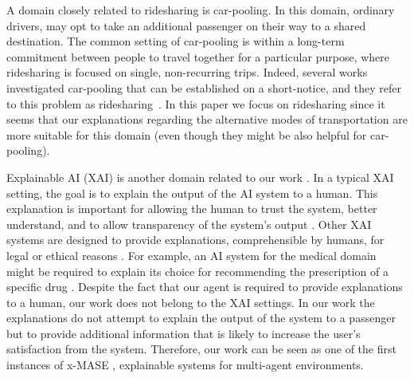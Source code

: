 \documentclass[letterpaper]{article} %
\begin{document}
A domain closely related to ridesharing is car-pooling. In this domain, ordinary drivers, may opt to take an additional passenger on their way to a shared destination. The common setting of car-pooling is within a long-term commitment between people to travel together for a particular purpose, where ridesharing is focused on single, non-recurring trips.
Indeed, several works investigated car-pooling that can be established on a short-notice, and they refer to this problem as ridesharing~\cite{agatz2012optimization}.
In this paper we focus on ridesharing since it seems that our explanations regarding the alternative modes of transportation are more suitable for this domain (even though they might be also helpful for car-pooling).



Explainable AI (XAI) is another domain related to our work \cite{core2006building,gunning2017explainable,carvalho2019machine}. In a typical XAI setting, the goal is to explain the output of the AI system to a human. This explanation is important for allowing the human to trust the system, better understand, and to allow transparency of the system's output \cite{adadi2018peeking}. Other XAI systems are designed to provide explanations, comprehensible by humans, for legal or ethical reasons \cite{doran2017does}. For example, an AI system for the medical domain might be required to explain its choice for recommending the prescription of a specific drug \cite{holzinger2017we}. %
Despite the fact that our agent is required to provide explanations to a human, our work does not belong to the XAI settings. In our work the explanations do not attempt to explain the output of the system to a passenger but to provide additional information that is likely to increase the user's satisfaction from the system. Therefore, our work can be seen as one of the first instances of x-MASE \cite{Kraus2019ai}, explainable systems for multi-agent environments.
\end{document}
